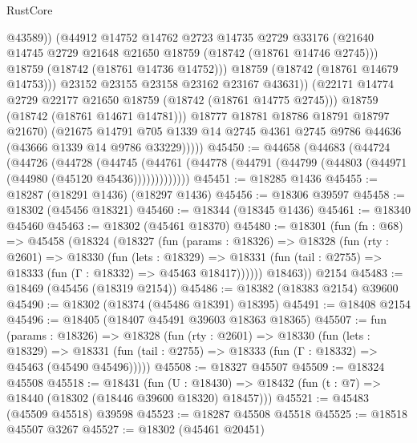\begin{lexlean}{RustCore}
\begin{coremodule}
                        @43589))
                    (@44912
                      @14752
                      @14762
                      @2723
                      @14735
                      @2729
                      @33176
                      (@21640 @14745 @2729 @21648 @21650 @18759 (@18742 (@18761 @14746 @2745)))
                      @18759
                      (@18742 (@18761 @14736 @14752)))
                    @18759
                    (@18742 (@18761 @14679 @14753)))
                  @23152
                  @23155
                  @23158
                  @23162
                  @23167
                  @43631))
              (@22171 @14774 @2729 @22177 @21650 @18759 (@18742 (@18761 @14775 @2745)))
              @18759
              (@18742 (@18761 @14671 @14781)))
            @18777
            @18781
            @18786
            @18791
            @18797
            @21670)
          (@21675
            @14791
            @705
            @1339
            @14
            @2745
            @4361
            @2745
            @9786
            @44636
            (@43666 @1339 @14 @9786 @33229)))))
@45450 := @44658
    (@44683
      (@44724
        (@44726
          (@44728
            (@44745
              (@44761 (@44778 (@44791 (@44799 (@44803 (@44971 (@44980 (@45120 @45436)))))))))))))
@45451 := @18285 @1436
@45455 := @18287 (@18291 @1436) (@18297 @1436)
@45456 := @18306 @39597
@45458 := @18302 (@45456 @18321)
@45460 := @18344 (@18345 @1436)
@45461 := @18340 @45460
@45463 := @18302 (@45461 @18370)
@45480 := @18301
    (fun (fn : @68) =>
    @45458
      (@18324
        (@18327
          (fun (params : @18326) =>
          @18328
            (fun (rty : @2601) =>
            @18330
              (fun (lets : @18329) =>
              @18331 (fun (tail : @2755) => @18333 (fun (Γ : @18332) => @45463 @18417))))))
        @18463))
    @2154
@45483 := @18469 (@45456 (@18319 @2154))
@45486 := @18382 (@18383 @2154) @39600
@45490 := @18302 (@18374 (@45486 @18391) @18395)
@45491 := @18408 @2154
@45496 := @18405 (@18407 @45491 @39603 @18363 @18365)
@45507 := fun (params : @18326) =>
  @18328
    (fun (rty : @2601) =>
    @18330
      (fun (lets : @18329) =>
      @18331 (fun (tail : @2755) => @18333 (fun (Γ : @18332) => @45463 (@45490 @45496)))))
@45508 := @18327 @45507
@45509 := @18324 @45508
@45518 := @18431
    (fun (U : @18430) => @18432 (fun (t : @7) => @18440 (@18302 (@18446 @39600 @18320) @18457)))
@45521 := @45483 (@45509 @45518) @39598
@45523 := @18287 @45508 @45518
@45525 := @18518 @45507 @3267
@45527 := @18302 (@45461 @20451)

\end{coremodule}
\end{lexlean}
